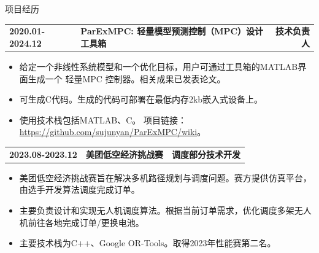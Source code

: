 \documentclass{resume} %
\makeatletter
\newcommand{\projectheader}[3]{%
  \begin{tabular*}{\linewidth}{@{}l@{\extracolsep{\fill}}l@{\extracolsep{\fill}}r@{}}
    \textbf{#1} & \textbf{#2} & \textbf{#3} \\
  \end{tabular*}%
  \vspace{-0.5em} %
}
\makeatother
\begin{document}
\begin{rSection}{项目经历}
    \vspace{3mm}
    \projectheader{2020.01-2024.12}{ParExMPC: 轻量模型预测控制（MPC）设计工具箱}{技术负责人}
    \begin{itemize}
        \item 给定一个非线性系统模型和一个优化目标，用户可通过工具箱的MATLAB界面生成一个 轻量MPC 控制器。相关成果已发表论文。
        \item 可生成C代码。生成的代码可部署在最低内存2kb嵌入式设备上。
        \item 使用技术栈包括MATLAB、C。 项目链接：\href{https://github.com/sujunyan/ParExMPC/wiki}{https://github.com/sujunyan/ParExMPC/wiki}。
    \end{itemize}

    \vspace{3mm}
    \projectheader{2023.08-2023.12}{美团低空经济挑战赛}{调度部分技术开发}
    \begin{itemize}
        \item 美团低空经济挑战赛旨在解决多机路径规划与调度问题。赛方提供仿真平台，由选手开发算法调度完成订单。
        \item 主要负责设计和实现无人机调度算法。根据当前订单需求，优化调度多架无人机前往各地完成订单/更换电池。
        \item 主要技术栈为C++、Google OR-Tools。取得2023年性能赛第二名。
    \end{itemize}





\end{rSection}
\end{document}
